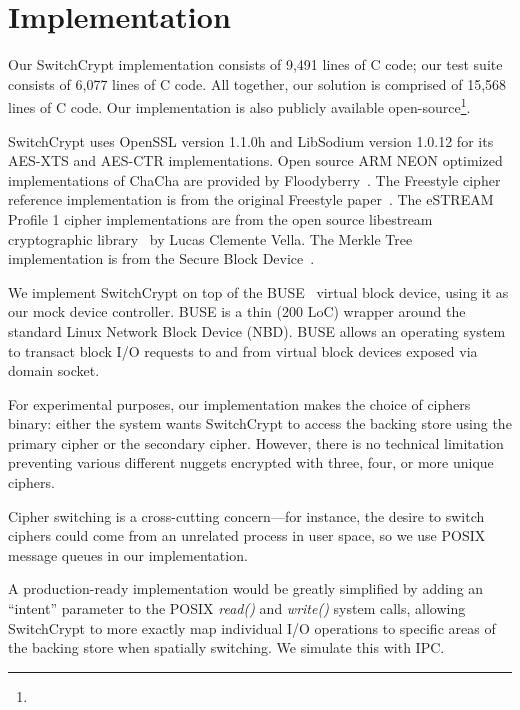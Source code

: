 \section{Implementation}\label{sec:implementation}

Our SwitchCrypt implementation consists of 9,491 lines of C code; our test suite
consists of 6,077 lines of C code. All together, our solution is comprised of
15,568 lines of C code. Our implementation is also publicly available
open-source\footnote{\SystemURI}.

SwitchCrypt uses OpenSSL version 1.1.0h and LibSodium version 1.0.12 for its
AES-XTS and AES-CTR implementations. Open source ARM NEON optimized
implementations of ChaCha are provided by Floodyberry~\cite{Floodyberry}. The
Freestyle cipher reference implementation is from the original Freestyle
paper~\cite{Freestyle}. The eSTREAM Profile 1 cipher implementations are from
the open source libestream cryptographic library~\cite{libestream} by Lucas
Clemente Vella. The Merkle Tree implementation is from the Secure Block
Device~\cite{SBD}.

We implement SwitchCrypt on top of the BUSE~\cite{BUSE} virtual block device,
using it as our mock device controller. BUSE is a thin (200 LoC) wrapper around
the standard Linux Network Block Device (NBD). BUSE allows an operating system
to transact block I/O requests to and from virtual block devices exposed via
domain socket.

For experimental purposes, our implementation makes the choice of ciphers
binary: either the system wants SwitchCrypt to access the backing store using the
primary cipher or the secondary cipher. However, there is no technical
limitation preventing various different nuggets encrypted with three, four, or
more unique ciphers.

Cipher switching is a cross-cutting concern---for instance, the desire to switch
ciphers could come from an unrelated process in user space, so we use POSIX
message queues in our implementation.

A production-ready implementation would be greatly simplified by adding an
``intent'' parameter to the POSIX \textit{read()} and \textit{write()} system
calls, allowing SwitchCrypt to more exactly map individual I/O operations to
specific areas of the backing store when spatially switching. We simulate this
with IPC. 

